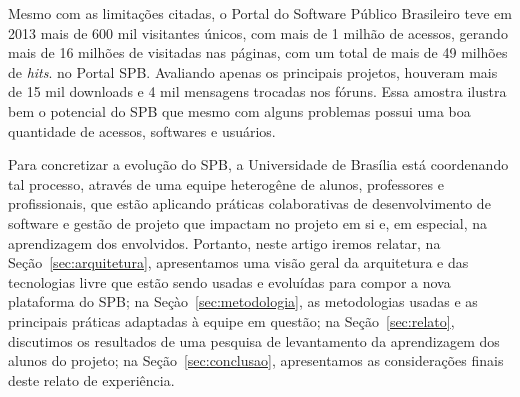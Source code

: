 Mesmo com as limitações citadas, o Portal do Software Público Brasileiro teve
em 2013 mais de 600 mil visitantes únicos, com mais de 1 milhão de acessos,
gerando mais de 16 milhões de visitadas nas páginas, com um total de mais de 49
milhões de \emph{hits}. no Portal SPB.
%
Avaliando apenas os principais projetos, houveram mais de 15 mil downloads e
4 mil mensagens trocadas nos fóruns.
%
Essa amostra ilustra bem o potencial do SPB que mesmo com alguns problemas
possui uma boa quantidade de acessos, softwares e usuários.


Para concretizar a evolução do SPB, a Universidade de Brasília está coordenando
tal processo, através de uma equipe heterogêne de alunos, professores e
profissionais, que estão aplicando práticas colaborativas de desenvolvimento
de software e gestão de projeto que impactam no projeto em si e, em especial,
na aprendizagem dos envolvidos.
%
Portanto, neste artigo iremos relatar,
%
na Seção~\ref{sec:arquitetura}, apresentamos uma visão geral da arquitetura e
das tecnologias livre que estão sendo usadas e evoluídas para compor a nova
plataforma do SPB;
%
na Seçào~\ref{sec:metodologia}, as
metodologias usadas e as principais práticas adaptadas à equipe em questão;
%
na Seção~\ref{sec:relato}, discutimos os resultados de uma pesquisa de
levantamento da aprendizagem dos alunos do projeto;
%
na Seção~\ref{sec:conclusao}, apresentamos as considerações finais deste relato
de experiência. 


